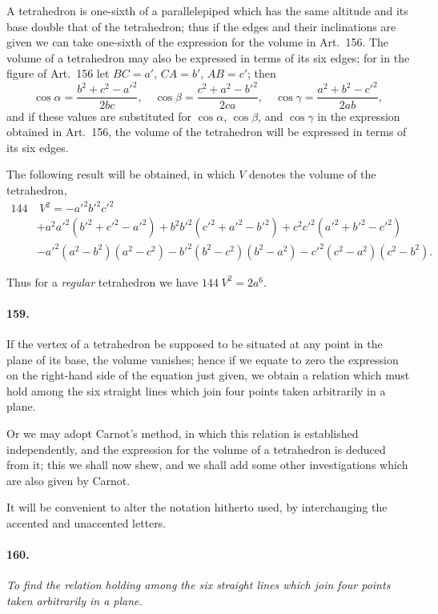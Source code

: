 \documentclass{book}[2004/02/16]
\begin{document}
\begin{mainmatter}
\begin{spacing}{1.3}
A tetrahedron is one-sixth of a parallelepiped which has the
same altitude and its base double that of the tetrahedron; thus if
the edges and their inclinations are given we can take one-sixth
of the expression for the volume in Art.~156. The volume of a
tetrahedron may also be expressed in terms of its six edges; for
in the figure of Art.~156 let $BC=a'$, $CA=b'$, $AB=c'$; then
\[
  \cos{\alpha}=\frac{b^2+c^2-a'^2}{2bc}, \quad
  \cos{\beta} =\frac{c^2+a^2-b'^2}{2ca}, \quad
  \cos{\gamma}=\frac{a^2+b^2-c'^2}{2ab},
\]
and if these values are substituted for $\cos{\alpha}$, $\cos{\beta}$, and $\cos{\gamma}$ in
the expression obtained in Art.~156, the volume of the tetrahedron
will be expressed in terms of its six edges.

The following result will be obtained, in which $V$ denotes the
volume of the tetrahedron,
\begin{align*}
144&\hspace{3pt}V^2 = -a'^2 b'^2 c'^2\\
& + a^2a'^2 (b'^2+c'^2-a'^2)
    + b^2b'^2 (c'^2+a'^2-b'^2)
    + c^2c'^2 (a'^2+b'^2-c'^2)\\
& - a'^2 (a^2-b^2) (a^2-c^2)
    - b'^2 (b^2-c^2) (b^2-a^2)
    - c'^2 (c^2-a^2) (c^2-b^2).
\end{align*}

Thus for a \textit{regular} tetrahedron we have $144\hspace{3pt}V^2=2a^6$.

\paragraph{159.} If the vertex of a tetrahedron be supposed to be situated
at any point in the plane of its base, the volume vanishes;
hence if we equate to zero the expression on the right-hand side
of the equation just given, we obtain a relation which must hold
among the six straight lines which join four points taken arbitrarily
in a plane.

Or we may adopt Carnot's method, in which this relation is
established independently, and the expression for the volume of a
tetrahedron is deduced from it; this we shall now shew, and we
shall add some other investigations which are also given by
Carnot.

It will be convenient to alter the notation hitherto used, by
interchanging the accented and unaccented letters.

\paragraph{160.} \textit{To find the relation holding among the six straight lines
which join four points taken arbitrarily in a plane.}


\end{spacing}
\end{mainmatter}
\end{document}
